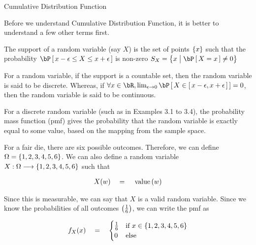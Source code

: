\documentclass{article}
\begin{document}
\begin{ssection}{Cumulative Distribution Function}

	Before we understand Cumulative Distribution Function, it is better to understand a few other terms first.

	\begin{definition}
		The support of a random variable (say $X$) is the set of points $\left\{ {x} \right\}$ such that the probability $\prob{x - \epsilon \le X \le x + \epsilon}$ is non-zero  $S_X = \set{x \pipe \prob{X = x} \ne 0}$
		\label{def:support}
	\end{definition}


	\begin{remark}
		For a random variable, if the support is a countable set, then the random variable is said to be discrete. Whereas, if $\forall x \in \bR, \lim_{\epsilon \ra 0} \prob{X \in \brac{x - \epsilon, x + \epsilon}} = 0$, then the random variable is said to be continuous.
		\label{rem:disc_cont}
	\end{remark}

	\begin{definition}
		For a discrete random variable (such as in Examples 3.1 to 3.4), the probability mass function (pmf) gives the probability that the random variable is exactly equal to some value, based on the mapping from the sample space.
		\label{def:pmf}
	\end{definition}

	\begin{example}[Die]
		For a fair die, there are six possible outcomes. Therefore, we can define $\Omega = \left\{ {1, 2, 3, 4, 5, 6} \right\}$. We can also define a random variable $X : \Omega \longrightarrow \left\{ {1, 2, 3, 4, 5, 6} \right\}$ such that

		\begin{align*}
			X(w)	\eq	\tfunc{value}{w}
		\end{align*}

		Since this is measurable, we can say that $X$ is a valid random variable. Since we know the probabilities of all outcomes $\left( {\frac{1}{6}} \right)$, we can write the pmf as

		\begin{align*}
			f_X(x)	\quad = \quad	\begin{cases}
				\frac{1}{6}	&	\text{if}\,\, x \in \left\{ {1, 2, 3, 4, 5, 6} \right\} \\
				0			&	\text{else}\,\,
			\end{cases}
		\end{align*}
	\end{example}


\end{ssection}
\end{document}
